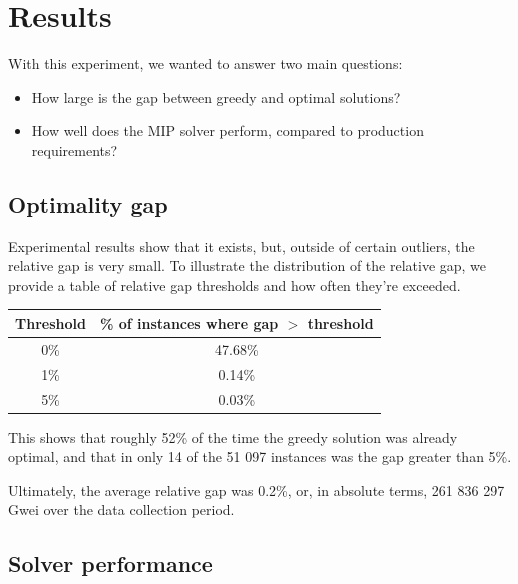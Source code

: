 \documentclass{article}
\begin{document}
\section{Results} \label{sec:results}

With this experiment, we wanted to answer two main questions:
\begin{itemize}
  \item How large is the gap between greedy and optimal solutions?
  \item How well does the MIP solver perform, compared to production
    requirements?
\end{itemize}

\subsection{Optimality gap}

Experimental results show that it exists, but, outside of certain outliers,
the relative gap is very small. To illustrate the distribution of the relative
gap, we provide a table of relative gap thresholds and how often they're
exceeded.

\begin{center}
\begin{tabular}{ |c|c| }
  \hline
  Threshold & \% of instances where gap $>$ threshold \\
  \hline
  0\% & 47.68\% \\
  1\% & 0.14\% \\
  5\% & 0.03\% \\
  \hline
\end{tabular}
\end{center}

This shows that roughly 52\% of the time the greedy solution was already
optimal, and that in only 14 of the 51 097 instances was the gap greater
than 5\%.

Ultimately, the average relative gap was 0.2\%, or, in absolute terms,
261 836 297 Gwei over the data collection period.

\subsection{Solver performance}
\end{document}
